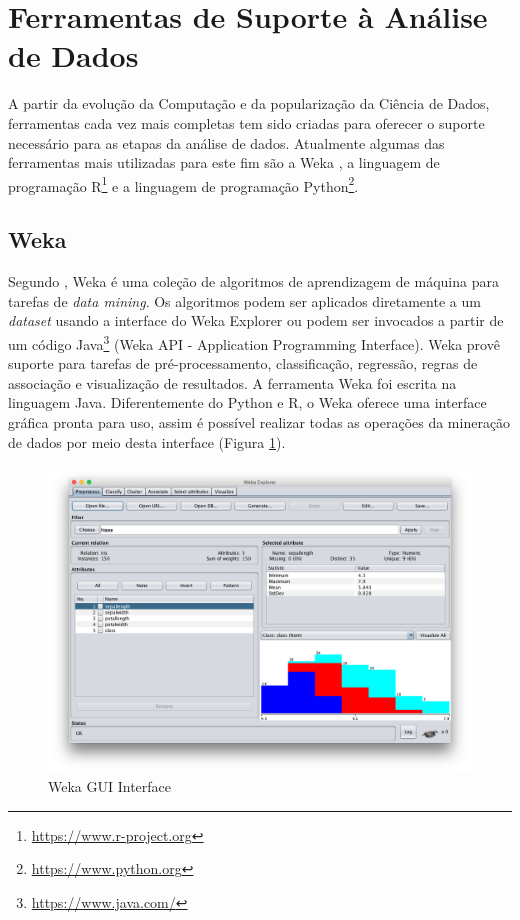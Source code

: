 \section{Ferramentas de Suporte à Análise de Dados}

A partir da evolução da Computação e da popularização da Ciência de Dados, ferramentas cada vez mais completas tem sido criadas para oferecer o suporte necessário para as etapas da análise de dados. Atualmente algumas das ferramentas mais utilizadas para este fim são a Weka \cite{Hall2009}, a linguagem de programação R\footnote{\url{https://www.r-project.org}} e a linguagem de programação Python\footnote{\url{https://www.python.org}}.

\subsection{Weka}

Segundo , Weka é uma coleção de algoritmos de aprendizagem de máquina para tarefas de \textit{data mining}. Os algoritmos podem ser aplicados diretamente a um \textit{dataset} usando a interface do Weka Explorer ou podem ser invocados a partir de um código Java\footnote{\url{https://www.java.com/}} (Weka API - Application Programming Interface). Weka provê suporte para tarefas de  pré-processamento, classificação, regressão, regras de associação e visualização de resultados. A ferramenta Weka foi escrita na linguagem  Java. Diferentemente do Python e R, o Weka oferece uma interface gráfica pronta para uso, assim é possível realizar todas as operações da mineração de dados por meio desta interface (Figura \ref{fig:weka}).

\begin{figure}[htb]
  \caption{\label{fig:weka}Weka GUI Interface}
  \begin{center}
    \includegraphics[scale=0.4]{imagens/weka.png}
  \end{center}
\end{figure}

